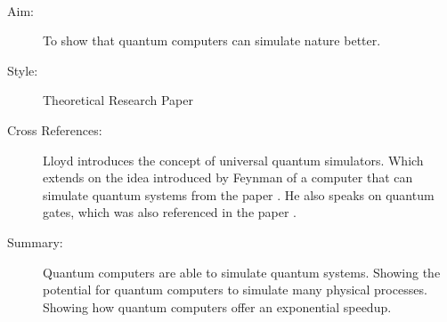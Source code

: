 \documentclass{Assignment}
\begin{document}
\newpage
\cite{UQS}~

\begin{description}
	\item[Aim:] 
	To show that quantum computers can simulate nature better.
	
	\item [Style:] Theoretical Research Paper
	
	\item [Cross References:]
	Lloyd introduces the concept of universal quantum simulators. 
	Which extends on the idea introduced by Feynman of a computer that can simulate quantum systems from the paper \cite{feynman1982simulating}. 
	He also speaks on quantum gates, which was also referenced in the paper \cite{Deutsch1989}.
	
	\item[Summary:] 
	Quantum computers are able to simulate quantum systems. 
	Showing the potential for quantum computers to simulate many physical processes.	
	Showing how quantum computers offer an exponential speedup.

	
	
\end{description}
\newpage
	 	
\end{document}
